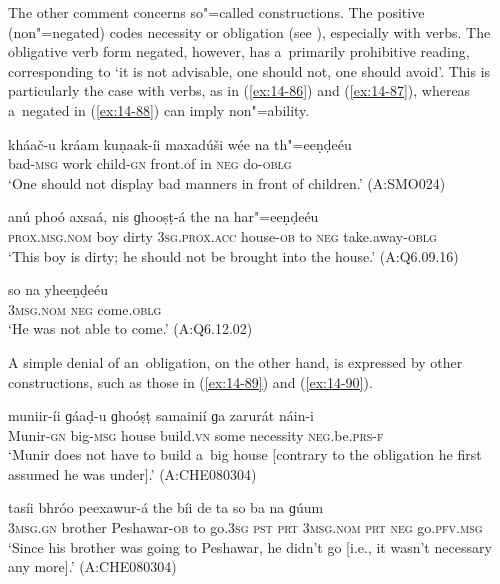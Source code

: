 The other comment concerns so"=called  constructions. The positive (non"=negated)  codes necessity or obligation (see ), especially with  verbs. The obligative verb form negated, however, has a~primarily prohibitive reading, corresponding to `it is not advisable, one should not, one should avoid'. This is particularly the case with  verbs, as in (\ref{ex:14-86}) and (\ref{ex:14-87}), whereas a~negated in  (\ref{ex:14-88}) can imply non"=ability.

\begin{exe}
\ex
\label{ex:14-86}
\gll kháač-u kráam kuṇaak-íi maxadúši wée na  th"=eeṇḍeéu \\
bad-\textsc{msg} work child-\textsc{gn} front.of in \textsc{neg} do-\textsc{oblg } \\
\glt `One should not display bad manners in front of children.' (A:SMO024)

\ex
\label{ex:14-87}
\gll anú phoó axsaá, nis ɡhooṣṭ-á  the na har"=eeṇḍeéu \\
\textsc{prox.msg.nom} boy dirty \textsc{3sg.prox.acc} house-\textsc{ob}  to \textsc{neg} take.away-\textsc{oblg }\\
\glt `This boy is dirty; he should not be brought into the house.' (A:Q6.09.16)

\ex
\label{ex:14-88}
\gll so na yheeṇḍeéu \\
\textsc{3msg}.\textsc{nom} \textsc{neg} come.\textsc{oblg}  \\
\glt `He was not able to come.' (A:Q6.12.02)
\end{exe}

A simple denial of an~obligation, on the other hand, is expressed by other constructions, such as those in (\ref{ex:14-89}) and (\ref{ex:14-90}).

\begin{exe}
\ex
\label{ex:14-89}
\gll muniir-íi ɡáaḍ-u ɡhoóṣṭ samainií ɡa zarurát  náin-i \\
Munir-\textsc{gn} big-\textsc{msg} house build.\textsc{vn} some necessity  \textsc{neg.}be.\textsc{prs}-\textsc{f } \\
\glt `Munir does not have to build a~big house [contrary to the obligation he first assumed he was under].' (A:CHE080304)

\ex
\label{ex:14-90}
\gll tasíi bhróo peexawur-á the bíi de ta  so ba na ɡúum \\
\textsc{3msg}.\textsc{gn} brother Peshawar-\textsc{ob} to go.\textsc{3sg} \textsc{pst} \textsc{prt}  \textsc{3msg.nom} \textsc{prt} \textsc{neg} go.\textsc{pfv.msg } \\
\glt `Since his brother was going to Peshawar, he didn't go [i.e., it wasn't necessary any more].' (A:CHE080304)
\end{exe}

